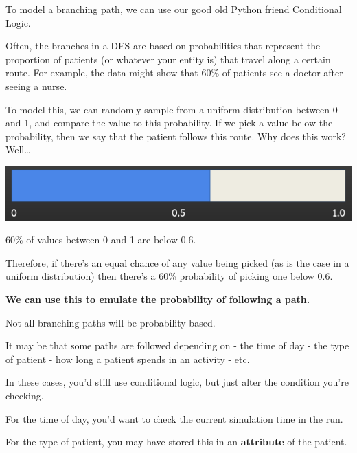 \documentclass[
  letterpaper,
  DIV=11,
  numbers=noendperiod]{scrreprt}
\begin{document}
To model a branching path, we can use our good old Python friend
Conditional Logic.

Often, the branches in a DES are based on probabilities that represent
the proportion of patients (or whatever your entity is) that travel
along a certain route. For example, the data might show that 60\% of
patients see a doctor after seeing a nurse.

To model this, we can randomly sample from a uniform distribution
between 0 and 1, and compare the value to this probability. If we pick a
value below the probability, then we say that the patient follows this
route. Why does this work? Well\ldots{}

\includegraphics{images/probability_bar.png}

60\% of values between 0 and 1 are below 0.6.

Therefore, if there's an equal chance of any value being picked (as is
the case in a uniform distribution) then there's a 60\% probability of
picking one below 0.6.

\textbf{We can use this to emulate the probability of following a path.}

\begin{tcolorbox}[enhanced jigsaw, rightrule=.15mm, colback=white, colframe=quarto-callout-note-color-frame, colbacktitle=quarto-callout-note-color!10!white, toprule=.15mm, coltitle=black, opacityback=0, titlerule=0mm, bottomtitle=1mm, breakable, title=\textcolor{quarto-callout-note-color}{\faInfo}\hspace{0.5em}{Note}, opacitybacktitle=0.6, toptitle=1mm, arc=.35mm, bottomrule=.15mm, leftrule=.75mm, left=2mm]

Not all branching paths will be probability-based.

It may be that some paths are followed depending on - the time of day -
the type of patient - how long a patient spends in an activity - etc.

In these cases, you'd still use conditional logic, but just alter the
condition you're checking.

For the time of day, you'd want to check the current simulation time in
the run.

For the type of patient, you may have stored this in an
\textbf{attribute} of the patient.

\end{tcolorbox}
\end{document}
